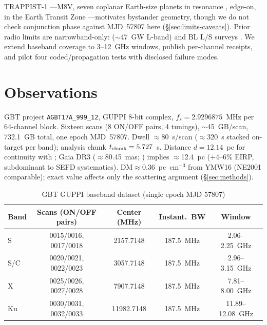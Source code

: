 \documentclass[twocolumn]{aastex631}
\begin{document}
TRAPPIST-1 \citep{gillon2017}---M8V, seven coplanar Earth-size planets in resonance \citep{luger2017, agol2021}, edge-on, in the Earth Transit Zone \citep{heller2016}---motivates bystander geometry, though we do not check conjunction phase against MJD~57807 here (\S\ref{sec:limits-caveats}). Prior radio limits are narrowband-only: \citet{pinchuk2019} ($\sim$47~GW L-band) and BL L/S surveys \citep{enriquez2017, price2020, lebofsky2019}. We extend baseband coverage to 3--12~GHz windows, publish per-channel receipts, and pilot four coded/propagation tests with disclosed failure modes.

\section{Observations}
\label{sec:obs}

GBT project \texttt{AGBT17A\_999\_12}, GUPPI 8-bit complex, $f_s=2.9296875$~MHz per 64-channel block. Sixteen scans (8 ON/OFF pairs, 4 tunings), $\sim$45~GB/scan, 732.1~GB total, one epoch MJD~57807. Dwell $\approx$80~s/scan ($\approx$320~s stacked on-target per band); analysis chunk $t_{\rm chunk}=5.727$~s. Distance $d=12.14$~pc \citep{gillon2017} for continuity with \citet{pinchuk2019}; Gaia DR3 ($\approx$80.45~mas; \citealt{gaia2021}) implies $\approx$12.4~pc (+4--6\% EIRP, subdominant to SEFD systematics). DM$\approx$0.36~pc~cm$^{-3}$ from YMW16 \citep{yao2017} (NE2001 \citealt{cordes2002} comparable); exact value affects only the scattering argument (\S\ref{sec:methods}).

\begin{table}[t]
\centering
\caption{GBT GUPPI baseband dataset (single epoch MJD 57807)}
\label{tab:obs}
\begin{tabular}{lcccc}
\toprule
Band & Scans (ON/OFF pairs) & Center (MHz) & Instant.\ BW & Window \\
\midrule
S      & 0015/0016, 0017/0018 & 2157.7148 & 187.5~MHz & 2.06--2.25~GHz \\
S/C    & 0020/0021, 0022/0023 & 3057.7148 & 187.5~MHz & 2.96--3.15~GHz \\
X      & 0025/0026, 0027/0028 & 7907.7148 & 187.5~MHz & 7.81--8.00~GHz \\
Ku     & 0030/0031, 0032/0033 & 11982.7148 & 187.5~MHz & 11.89--12.08~GHz \\
\bottomrule
\end{tabular}
\end{table}
\end{document}
